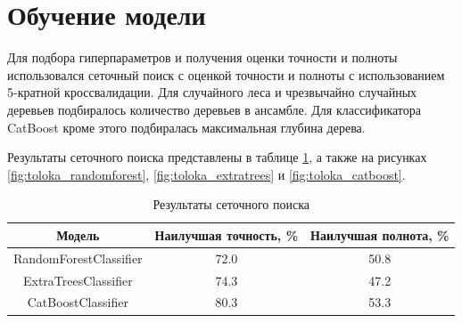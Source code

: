 \section{Обучение модели}

Для подбора гиперпараметров и получения оценки точности и полноты использовался сеточный поиск с оценкой точности и полноты с использованием 5-кратной кроссвалидации. Для случайного леса и чрезвычайно случайных деревьев подбиралось количество деревьев в ансамбле. Для классификатора CatBoost кроме этого подбиралась максимальная глубина дерева.

Результаты сеточного поиска представлены в таблице \ref{tab:toloka_grid_search}, а также на рисунках \ref{fig:toloka_randomforest}, \ref{fig:toloka_extratrees} и \ref{fig:toloka_catboost}.

\begin{table}[h]
    \centering
    \begin{tabular}{|c|c|c|}
        \hline
        Модель & Наилучшая точность, \% & Наилучшая полнота, \% \\
        \hline
        RandomForestClassifier & 72.0 & 50.8 \\
        \hline
        ExtraTreesClassifier & 74.3 & 47.2 \\
        \hline
        CatBoostClassifier & 80.3 & 53.3 \\
        \hline
    \end{tabular}
    \caption{Результаты сеточного поиска}
    \label{tab:toloka_grid_search}
\end{table}

